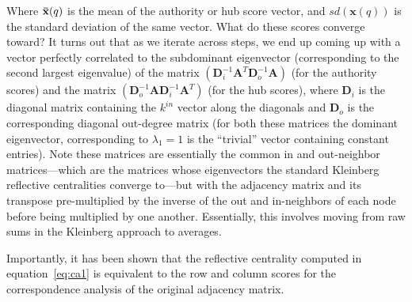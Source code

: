 \documentclass[a4paper,fleqn]{cas-sc}
\begin{document}
Where $\mathbf{\Bar{x}}(q)$ is the mean of the authority or hub score vector, and $sd(\mathbf{x}(q))$ is the standard deviation of the same vector. What do these scores converge toward? It turns out that as we iterate across steps, we end up coming up with a vector perfectly correlated to the subdominant eigenvector (corresponding to the second largest eigenvalue) of the matrix $(\mathbf{D}_{i}^{-1} \mathbf{A}^T \mathbf{D}_{o}^{-1} \mathbf{A})$ (for the authority scores) and the matrix $(\mathbf{D}_{o}^{-1} \mathbf{A} \mathbf{D}_{i}^{-1} \mathbf{A}^T)$ (for the hub scores), where $\mathbf{D}_{i}$ is the diagonal matrix containing the $k^{in}$ vector along the diagonals and $\mathbf{D}_{o}$ is the corresponding diagonal out-degree matrix (for both these matrices the dominant eigenvector, corresponding to $\lambda_1 = 1$ is the ``trivial'' vector containing constant entries). Note these matrices are essentially the common in and out-neighbor matrices---which are the matrices whose eigenvectors the standard Kleinberg reflective centralities converge to---but with the adjacency matrix and its transpose pre-multiplied by the inverse of the out and in-neighbors of each node before being multiplied by one another. Essentially, this involves moving from raw sums in the Kleinberg approach to averages.

Importantly, it has been shown that the reflective centrality computed in equation~\ref{eq:ca1} is equivalent to the row and column scores for the correspondence analysis of the original adjacency matrix. 


% 



\end{document}
